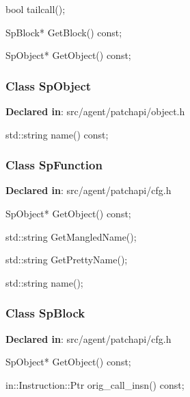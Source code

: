 \begin{apient}
bool tailcall();
\end{apient}
\apidesc{
}

\begin{apient}
SpBlock* GetBlock() const;
\end{apient}
\apidesc{
}

\begin{apient}
SpObject* GetObject() const;
\end{apient}
\apidesc{
}


\subsubsection{Class SpObject}
\textbf{Declared in}: src/agent/patchapi/object.h

\begin{apient}
std::string name() const;
\end{apient}
\apidesc{
}


\subsubsection{Class SpFunction}
\textbf{Declared in}: src/agent/patchapi/cfg.h

\begin{apient}
SpObject* GetObject() const;
\end{apient}
\apidesc{
}

\begin{apient}
std::string GetMangledName();
\end{apient}
\apidesc{
}

\begin{apient}
std::string GetPrettyName();
\end{apient}
\apidesc{
}

\begin{apient}
std::string name();
\end{apient}
\apidesc{
}

\subsubsection{Class SpBlock}
\textbf{Declared in}: src/agent/patchapi/cfg.h

\begin{apient}
SpObject* GetObject() const;
\end{apient}
\apidesc{
}

\begin{apient}
in::Instruction::Ptr orig_call_insn() const;
\end{apient}
\apidesc{
}

